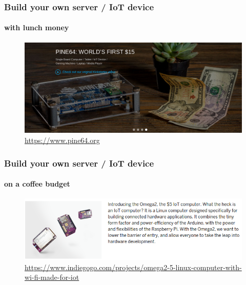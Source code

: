 	\begin{frame}
	\frametitle{Build your own server / IoT device}
	\framesubtitle{with lunch money}
	        \begin{figure}[h]
                \centering
                \includegraphics[width=.8\textwidth]{../pics/pine64}
		\caption{\url{https://www.pine64.org}}
        	\end{figure}
	\end{frame}

	\begin{frame}
	\frametitle{Build your own server / IoT device}
	\framesubtitle{on a coffee budget}
	        \begin{figure}[h]
                \centering
                \includegraphics[width=.8\textwidth]{../pics/Omega2}
		\caption{\tiny{\url{https://www.indiegogo.com/projects/omega2-5-linux-computer-with-wi-fi-made-for-iot}}}
        	\end{figure}
	\end{frame}

